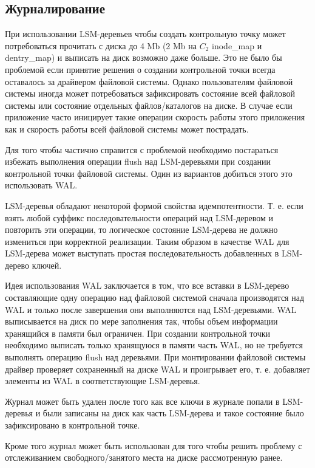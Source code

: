 \subsection{Журналирование}

При использовании LSM-деревьев чтобы создать контрольную точку может
потребоваться прочитать с диска до 4 Mb (2 Mb на $C_2$ inode\_map и dentry\_map)
и выписать на диск возможно даже больше. Это не было бы проблемой если принятие
решения о создании контрольной точки всегда оставалось за драйвером файловой
системы. Однако пользователям файловой системы иногда может потребоваться
зафиксировать состояние всей файловой системы или состояние отдельных
файлов/каталогов на диске. В случае если приложение часто иницирует такие
операции скорость работы этого приложения как и скорость работы всей файловой
системы может пострадать.

Для того чтобы частично справится с проблемой необходимо постараться избежать
выполнения операции flush над LSM-деревьями при создании контрольной точки
файловой системы. Один из вариантов добиться этого это использовать WAL.

LSM-деревья обладают некоторой формой свойства идемпотентности. Т. е. если взять
любой суффикс последовательности операций над LSM-деревом и повторить эти
операции, то логическое состояние LSM-дерева не должно измениться при корректной
реализации. Таким образом в качестве WAL для LSM-дерева может выступать простая
последовательность добавленных в LSM-дерево ключей.

Идея использования WAL заключается в том, что все вставки в LSM-дерево
составляющие одну операцию над файловой системой сначала производятся над WAL
и только после завершения они выполняются над LSM-деревьями. WAL выписывается на
диск по мере заполнения так, чтобы объем информации хранящийся в памяти был
ограничен. При создании контрольной точки необходимо выписать только хранящуюся
в памяти часть WAL, но не требуется выполнять операцию flush над деревьями. При
монтировании файловой системы драйвер проверяет сохраненный на диске WAL и
проигрывает его, т. е. добавляет элементы из WAL в соответствующие LSM-деревья.

Журнал может быть удален после того как все ключи в журнале попали в LSM-деревья
и были записаны на диск как часть LSM-дерева и такое состояние было
зафиксировано в контрольной точке.

Кроме того журнал может быть использован для того чтобы решить проблему с
отслеживанием свободного/занятого места на диске рассмотренную ранее.


